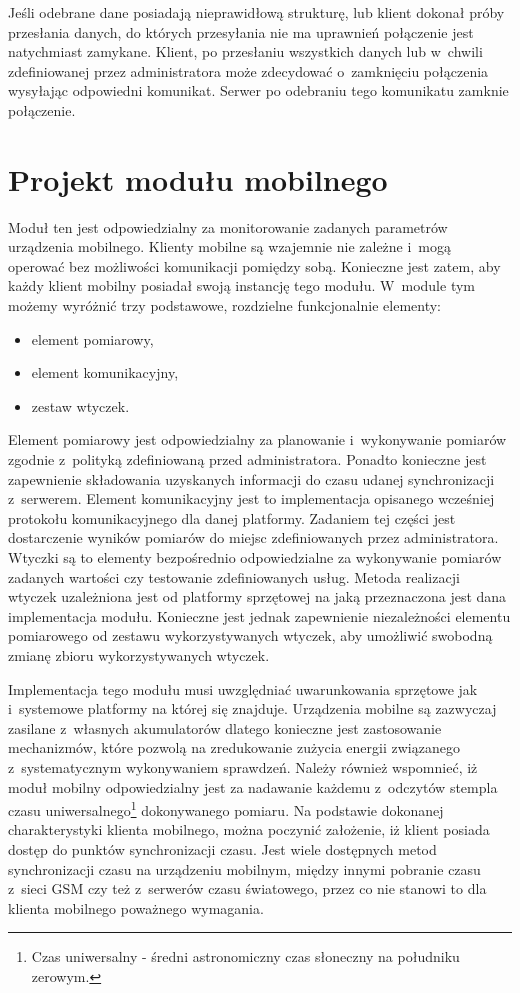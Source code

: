 Jeśli odebrane dane posiadają nieprawidłową strukturę, lub klient
dokonał próby przesłania danych, do których przesyłania nie ma
uprawnień połączenie jest natychmiast zamykane. Klient, po przesłaniu
wszystkich danych lub w~chwili zdefiniowanej przez administratora może
zdecydować o~zamknięciu połączenia wysyłając odpowiedni
komunikat. Serwer po odebraniu tego komunikatu zamknie połączenie.


\section[Projekt modułu mobilnego][Projekt modułu mobilnego]{Projekt modułu mobilnego}

Moduł ten jest odpowiedzialny za monitorowanie zadanych parametrów
urządzenia mobilnego. Klienty mobilne są wzajemnie nie zależne i~mogą
operować bez możliwości komunikacji pomiędzy sobą. Konieczne jest
zatem, aby każdy klient mobilny posiadał swoją instancję tego
modułu. W~module tym możemy wyróżnić trzy podstawowe, rozdzielne
funkcjonalnie elementy:

\begin{itemize}
\item element pomiarowy,
\item element komunikacyjny,
\item zestaw wtyczek.
\end{itemize}

Element pomiarowy jest odpowiedzialny za planowanie i~wykonywanie
pomiarów zgodnie z~polityką zdefiniowaną przed administratora. Ponadto
konieczne jest zapewnienie składowania uzyskanych informacji do czasu
udanej synchronizacji z~serwerem. Element komunikacyjny jest to
implementacja opisanego wcześniej protokołu komunikacyjnego dla danej
platformy. Zadaniem tej części jest dostarczenie wyników pomiarów do
miejsc zdefiniowanych przez administratora. Wtyczki są to elementy
bezpośrednio odpowiedzialne za wykonywanie pomiarów zadanych wartości
czy testowanie zdefiniowanych usług. Metoda realizacji wtyczek
uzależniona jest od platformy sprzętowej na jaką przeznaczona jest
dana implementacja modułu. Konieczne jest jednak zapewnienie
niezależności elementu pomiarowego od zestawu wykorzystywanych
wtyczek, aby umożliwić swobodną zmianę zbioru wykorzystywanych
wtyczek.

Implementacja tego modułu musi uwzględniać uwarunkowania sprzętowe jak
i~systemowe platformy na której się znajduje. Urządzenia mobilne są
zazwyczaj zasilane z~własnych akumulatorów dlatego konieczne jest
zastosowanie mechanizmów, które pozwolą na zredukowanie zużycia
energii związanego z~systematycznym wykonywaniem sprawdzeń. Należy
również wspomnieć, iż moduł mobilny odpowiedzialny jest za nadawanie
każdemu z~odczytów stempla czasu uniwersalnego\footnote{Czas
  uniwersalny - średni astronomiczny czas słoneczny na południku
  zerowym.} dokonywanego pomiaru. Na podstawie dokonanej
charakterystyki klienta mobilnego, można poczynić założenie, iż klient
posiada dostęp do punktów synchronizacji czasu. Jest wiele dostępnych
metod synchronizacji czasu na urządzeniu mobilnym, między innymi
pobranie czasu z~sieci GSM czy też z~serwerów czasu światowego, przez
co nie stanowi to dla klienta mobilnego poważnego wymagania.

